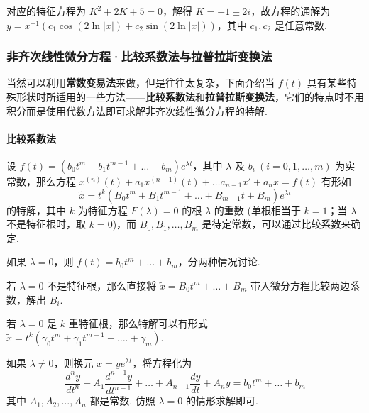 对应的特征方程为 $\displaystyle K^{2}+2K+5=0$，解得 $\displaystyle K=-1\pm2i$，故方程的通解为 $\displaystyle y=x^{-1}(c_{1}\cos(2\ln \lvert x \rvert)+c_2\sin(2\ln \lvert x \rvert))$，其中 $\displaystyle c_{1},c_{2}$ 是任意常数.

\subsubsection{非齐次线性微分方程·比较系数法与拉普拉斯变换法}

\begin{note}
    当然可以利用\textbf{常数变易法}来做，但是往往太复杂，下面介绍当 $\displaystyle f(t)$ 具有某些特殊形状时所适用的一些方法——\textbf{比较系数法}和\textbf{拉普拉斯变换法}，它们的特点时不用积分而是使用代数方法即可求解非齐次线性微分方程的特解.
\end{note}
\paragraph{比较系数法}

设 $\displaystyle f(t)=(b_{0}t^{m}+b_{1}t^{m-1}+\dots+b_{m})e^{ \lambda t }$，其中 $\displaystyle \lambda$ 及 $\displaystyle b_{i}\ (i=0,1,\dots,m)$ 为实常数，那么方程 $\displaystyle x^{(n)}(t)+a_{1}x^{(n-1)}(t)+\dots a_{n-1}x'+a_{n}x=f(t)$ 有形如
$$
    \widetilde{x}=t^{k}(B_{0}t^{m}+B_{1}t^{m-1}+\dots+B_{m-1}t+B_{m})e^{ \lambda t }
$$
的特解，其中 $k$ 为特征方程 $\displaystyle F(\lambda)=0$ 的根 $\displaystyle \lambda$ 的重数 (单根相当于 $\displaystyle k=1$；当 $\displaystyle \lambda$ 不是特征根时，取 $\displaystyle k=0$)，而 $\displaystyle B_{0},B_{1},\dots,B_{m}$ 是待定常数，可以通过比较系数来确定.

如果 $\displaystyle \lambda=0$，则 $\displaystyle f(t)=b_{0}t^{m}+\dots+b_{m}$，分两种情况讨论.

若 $\displaystyle \lambda=0$ 不是特征根，那么直接将 $\displaystyle \widetilde{x}=B_{0}t^{m}+\dots+B_{m}$ 带入微分方程比较两边系数，解出 $\displaystyle B_{i}$.

若 $\displaystyle \lambda=0$ 是 $k$ 重特征根，那么特解可以有形式 $\displaystyle \widetilde{x}=t^{k}(\gamma_{0}t^{m}+\gamma_{1}t^{m-1}+\dots.+\gamma _{m})$.

如果 $\displaystyle \lambda\neq0$，则换元 $\displaystyle x=ye^{ \lambda t }$，将方程化为
$$
    \frac{d^{n}y}{dt^{n}}+A_{1}\frac{d^{n-1}y}{dt^{n-1}}+\dots+A_{n-1}\frac{dy}{dt}+A_{n}y=b_{0}t^{m}+\dots+b_{m}
$$
其中 $\displaystyle A_{1},A_{2},\dots,A_{n}$ 都是常数. 仿照 $\displaystyle \lambda=0$ 的情形求解即可.

